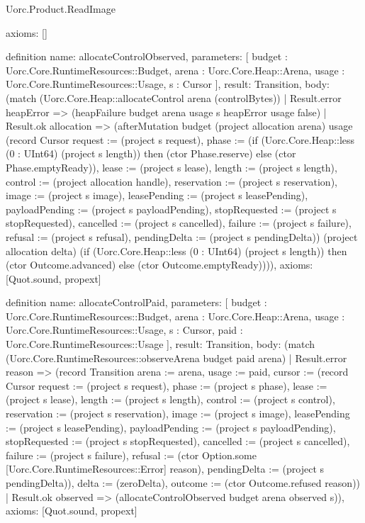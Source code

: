 \begin{lexlean}{Uorc.Product.ReadImage}
\begin{semanticmodule}
{  axioms: []
}

definition{
  name: allocateControlObserved,
  parameters: [
    budget : Uorc.Core.RuntimeResources::Budget,
    arena : Uorc.Core.Heap::Arena,
    usage : Uorc.Core.RuntimeResources::Usage,
    s : Cursor
  ],
  result: Transition,
  body: (match (Uorc.Core.Heap::allocateControl arena (controlBytes))
    | Result.error heapError => (heapFailure budget arena usage s heapError usage false)
    | Result.ok allocation => (afterMutation budget (project allocation arena) usage (record Cursor {request := (project s request), phase := (if (Uorc.Core.Heap::less (0 : UInt64) (project s length)) then (ctor Phase.reserve) else (ctor Phase.emptyReady)), lease := (project s lease), length := (project s length), control := (project allocation handle), reservation := (project s reservation), image := (project s image), leasePending := (project s leasePending), payloadPending := (project s payloadPending), stopRequested := (project s stopRequested), cancelled := (project s cancelled), failure := (project s failure), refusal := (project s refusal), pendingDelta := (project s pendingDelta)}) (project allocation delta) (if (Uorc.Core.Heap::less (0 : UInt64) (project s length)) then (ctor Outcome.advanced) else (ctor Outcome.emptyReady)))),
  axioms: [Quot.sound, propext]
}

definition{
  name: allocateControlPaid,
  parameters: [
    budget : Uorc.Core.RuntimeResources::Budget,
    arena : Uorc.Core.Heap::Arena,
    usage : Uorc.Core.RuntimeResources::Usage,
    s : Cursor,
    paid : Uorc.Core.RuntimeResources::Usage
  ],
  result: Transition,
  body: (match (Uorc.Core.RuntimeResources::observeArena budget paid arena)
    | Result.error reason => (record Transition {arena := arena, usage := paid, cursor := (record Cursor {request := (project s request), phase := (project s phase), lease := (project s lease), length := (project s length), control := (project s control), reservation := (project s reservation), image := (project s image), leasePending := (project s leasePending), payloadPending := (project s payloadPending), stopRequested := (project s stopRequested), cancelled := (project s cancelled), failure := (project s failure), refusal := (ctor Option.some [Uorc.Core.RuntimeResources::Error] reason), pendingDelta := (project s pendingDelta)}), delta := (zeroDelta), outcome := (ctor Outcome.refused reason)})
    | Result.ok observed => (allocateControlObserved budget arena observed s)),
  axioms: [Quot.sound, propext]
}


\end{semanticmodule}
\end{lexlean}
